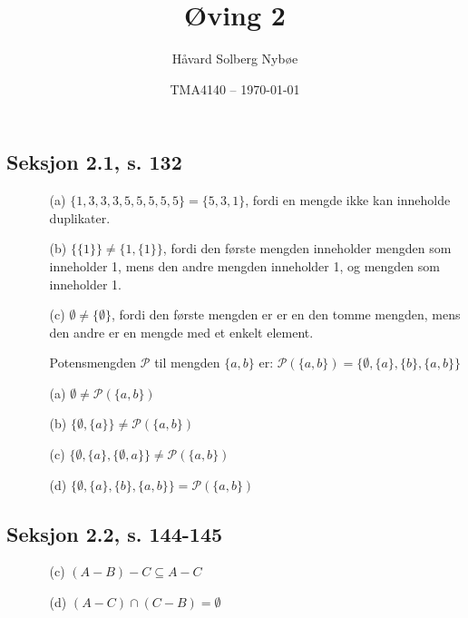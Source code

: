 \documentclass[a4paper, 12pt]{article}  %
\title{Øving 2}               %
\author{Håvard Solberg Nybøe}           %
\date{TMA4140 -- \today}                    %
\begin{document}
\maketitle

\subsection*{Seksjon 2.1, s. 132}
\begin{enumerate}
    \item [\boxed{7}]
          \begin{enumerate}
              \item [(a)] $ \{1,3,3,3,5,5,5,5,5\} = \{5,3,1\}$, fordi en mengde ikke kan inneholde duplikater.
              \item [(b)] $\{\{1\}\} \neq  \{1, \{1\}\}$, fordi den første mengden inneholder mengden som inneholder 1, mens den andre mengden inneholder 1, og mengden som inneholder 1.
              \item [(c)] $ \emptyset \neq \{\emptyset\}$, fordi den første mengden er er en den tomme mengden, mens den andre er en mengde med et enkelt element.
          \end{enumerate}
    \item [\boxed{26}]
          \begin{enumerate}
              \item [] Potensmengden $\mathcal{P}$ til mengden $\{a, b\}$ er: $\mathcal{P}(\{a, b\}) = \{\emptyset, \{a\}, \{b\}, \{a, b\}\}$
              \item [(a)] $\emptyset \neq \mathcal{P}(\{a, b\})$
              \item [(b)] $\{\emptyset, \{a\}\} \neq \mathcal{P}(\{a, b\})$
              \item [(c)] $\{\emptyset, \{a\}, \{\emptyset, a\}\} \neq \mathcal{P}(\{a, b\})$
              \item [(d)] $\{\emptyset, \{a\}, \{b\}, \{a, b\}\} = \mathcal{P}(\{a, b\})$
          \end{enumerate}
\end{enumerate}

\subsection*{Seksjon 2.2, s. 144-145}
\begin{enumerate}
    \item [\boxed{20}]
          \begin{enumerate}
              \item [(c)] $(A - B) - C \subseteq A - C$
              \item [(d)] $(A - C) \cap (C - B) = \emptyset $
          \end{enumerate}
    \item [\boxed{52}]
\end{enumerate}
\end{document}
